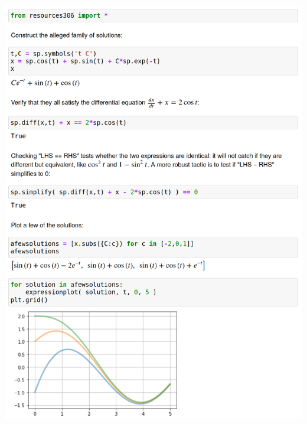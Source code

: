 \documentclass[12pt]{book}
\begin{document}
\parbox[c]{7.5in}{\includegraphics[width=6.5in]{additional_figures/checking_solutions.png}}

\newpage %
\end{document}
